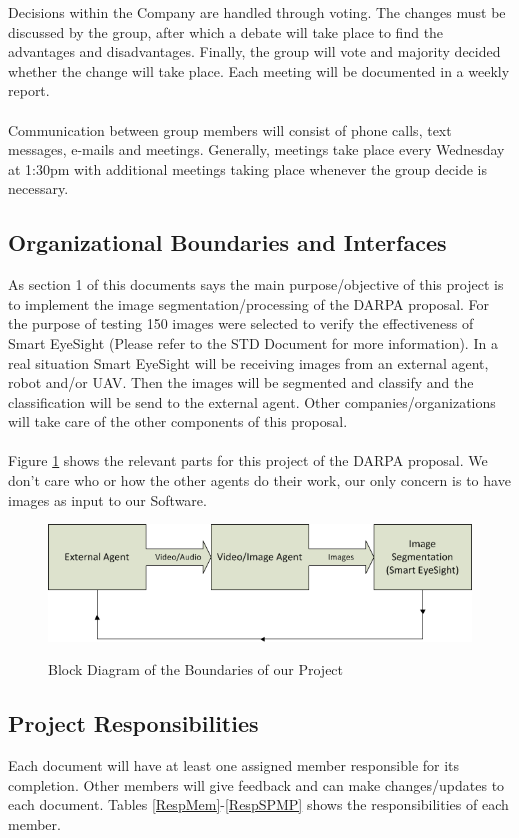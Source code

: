 \documentclass[12pt]{article}
\begin{document}
Decisions within the Company are handled through voting. The changes must be discussed by the group, after which a debate will take place to find the advantages and disadvantages. Finally, the group will vote and majority decided whether the change will take place. Each meeting will be documented in a weekly report.\\\\
Communication between group members will consist of phone calls, text messages, e-mails and meetings. Generally, meetings take place every Wednesday at 1:30pm with additional meetings taking place whenever the group decide is necessary.

\subsection{Organizational Boundaries and Interfaces}
As section 1 of this documents says the main purpose/objective of this project is to implement the image segmentation/processing of the DARPA proposal. For the purpose of testing 150 images were selected to verify the effectiveness of Smart EyeSight (Please refer to the STD Document for more information). In a real situation Smart EyeSight will be receiving images from an external agent, robot and/or UAV. Then the images will be segmented and classify and the classification will be send to the external agent. Other companies/organizations will take care of the other components of this proposal.\\\\
Figure \ref{boundaries} shows the relevant parts for this project of the DARPA proposal. We don't care who or how the other agents do their work, our only concern is to have images as input to our Software.

\begin{figure}[H]\centering
  \includegraphics[width=6.0in]{images/boundaries}\\
  \caption{Block Diagram of the Boundaries of our Project}\label{boundaries}
  \end{figure}

\subsection{Project Responsibilities}
Each document will have at least one assigned member responsible for its completion. Other members will give feedback and can make changes/updates to each document. Tables \ref{RespMem}-\ref{RespSPMP} shows the responsibilities of each member.
\end{document}
